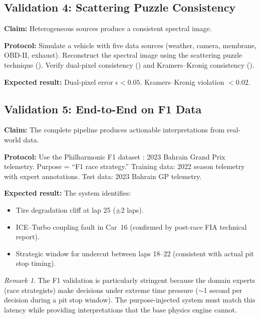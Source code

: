 \documentclass[11pt,twocolumn,a4paper]{article}
\theoremstyle{definition}
\theoremstyle{remark}
\newtheorem{remark}[theorem]{Remark}
\begin{document}
\subsection{Validation 4: Scattering Puzzle Consistency}

\textbf{Claim:} Heterogeneous sources produce a consistent spectral image.

\textbf{Protocol:} Simulate a vehicle with five data sources (weather, camera, membrane, OBD-II, exhaust).  Reconstruct the spectral image using the scattering puzzle technique ().  Verify dual-pixel consistency () and Kramers--Kronig consistency ().

\textbf{Expected result:} Dual-pixel error $\epsilon < 0.05$.  Kramers--Kronig violation $< 0.02$.

\subsection{Validation 5: End-to-End on F1 Data}

\textbf{Claim:} The complete pipeline produces actionable interpretations from real-world data.

\textbf{Protocol:} Use the Philharmonic F1 dataset \citep{sachikonye2026philharmonic}: 2023 Bahrain Grand Prix telemetry.  Purpose = ``F1 race strategy.''  Training data: 2022 season telemetry with expert annotations.  Test data: 2023 Bahrain GP telemetry.

\textbf{Expected result:} The system identifies:
\begin{itemize}
    \item Tire degradation cliff at lap 25 ($\pm 2$ laps).
    \item ICE--Turbo coupling fault in Car~16 (confirmed by post-race FIA technical report).
    \item Strategic window for undercut between laps 18--22 (consistent with actual pit stop timing).
\end{itemize}

\begin{remark}
The F1 validation is particularly stringent because the domain experts (race strategists) make decisions under extreme time pressure ($\sim$1 second per decision during a pit stop window).  The purpose-injected system must match this latency while providing interpretations that the base physics engine cannot.
\end{remark}
\end{document}
